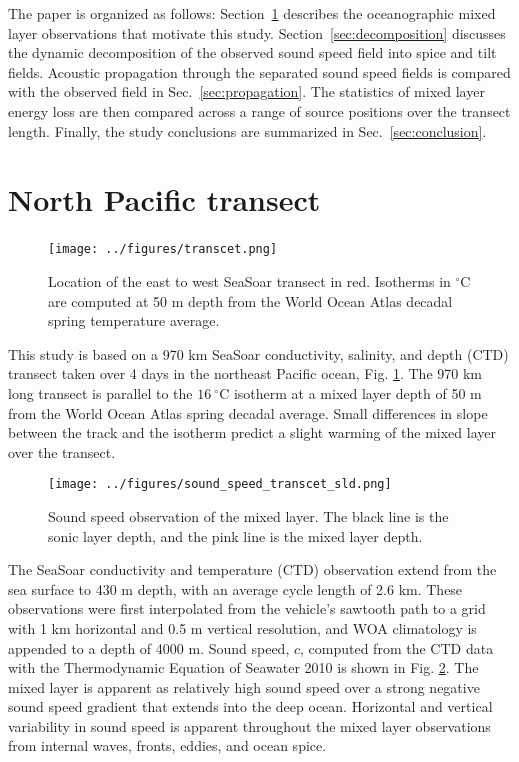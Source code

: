 \documentclass[preprint,NumberedRefs]{JASA}
\begin{document}
The paper is organized as follows: Section~\ref{sec:transcet} describes the oceanographic mixed layer observations that motivate this study. Section~\ref{sec:decomposition} discusses the dynamic decomposition of the observed sound speed field into spice and tilt fields. Acoustic propagation through the separated sound speed fields is compared with the observed field in Sec.~\ref{sec:propagation}. The statistics of mixed layer energy loss are then compared across a range of source positions over the transect length. Finally, the study conclusions are summarized in Sec.~\ref{sec:conclusion}.

\section{North Pacific transect}\label{sec:transcet}
\begin{figure}
\texttt{[image: ../figures/transcet.png]}
    \caption{\label{fig:transcet}{Location of the east to west SeaSoar transect in red. Isotherms in $^\circ$C are computed at 50 m depth from the World Ocean Atlas decadal spring temperature average\citep{WOA}.}}
\end{figure}

This study is based on a 970 km SeaSoar conductivity, salinity, and depth (CTD) transect taken over 4 days in the northeast Pacific ocean,\citep{cole2010seasonal} Fig. \ref{fig:transcet}. The 970 km long transect is parallel to the $16 \ ^\circ$C isotherm at a mixed layer depth of 50 m from the World Ocean Atlas spring decadal average\citep{WOA}. Small differences in slope between the track and the isotherm predict a slight warming of the mixed layer over the transect.

\begin{figure}
\texttt{[image: ../figures/sound\_speed\_transcet\_sld.png]}
\caption{\label{fig:c_grid}{Sound speed observation of the mixed layer. The black line is the sonic layer depth, and the pink line is the mixed layer depth.}}
\end{figure}

The SeaSoar conductivity and temperature (CTD) observation\citep{colosi2020observations} extend from the sea surface to 430 m depth, with an average cycle length of 2.6 km. These observations were first interpolated from the vehicle's sawtooth path to a grid with 1 km horizontal and 0.5 m vertical resolution, and WOA climatology is appended to a depth of 4000 m\citep{WOA}. Sound speed, $c$, computed from the CTD data with the Thermodynamic Equation of Seawater 2010\cite{TEOS-10} is shown in Fig. \ref{fig:c_grid}. The mixed layer is apparent as relatively high sound speed over a strong negative sound speed gradient that extends into the deep ocean. Horizontal and vertical variability in sound speed is apparent throughout the mixed layer observations from internal waves, fronts, eddies, and ocean spice\citep{colosi2020observations}.
\end{document}
